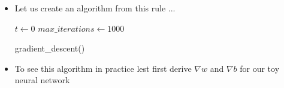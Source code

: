 \begin{frame}
	\begin{overlayarea}{\textwidth}{\textheight}
		\begin{itemize}\justifying
			\item <1-> Let us create an algorithm from this rule ...
			      \only<2-> {
				      \begin{algorithm}[H]
					      \SetAlgoLined
					      $t \leftarrow 0$\;
					      $max\_iterations\leftarrow 1000$\;
					      \caption{gradient\_descent()}
				      \end{algorithm}
			      }
			\item <2-> To see this algorithm in practice lest first derive $\nabla w$ and $\nabla b$ for our toy neural network
		\end{itemize}
	\end{overlayarea}
\end{frame}

